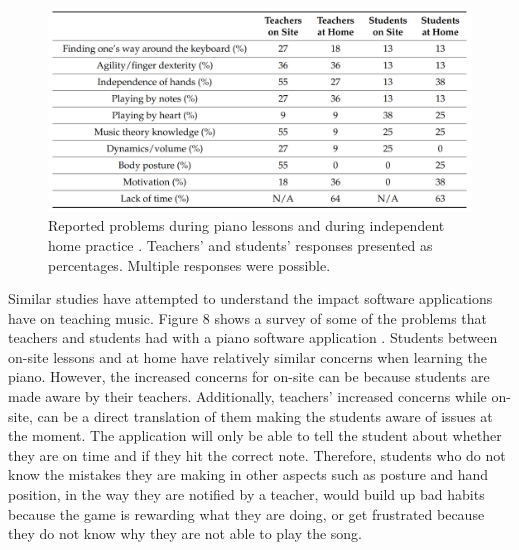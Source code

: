 \documentclass[10pt,twocolumn]{article}
\begin{document}
\begin{figure}
    \centering
    \includegraphics[width=.95\linewidth]{PianoLearningProblemsTable.png}
    \caption{
       Reported problems during piano lessons and during independent home practice \cite{PianoTeachingAndLearningConcerns}. Teachers’ and students’ responses presented as percentages. Multiple responses were possible.
    }
    \label{fig:first-page}
\end{figure}

Similar studies have attempted to understand the impact software applications have on teaching music. Figure 8 shows a survey of some of the problems that teachers and students had with a piano software application \cite{PianoTeachingAndLearningConcerns}. Students between on-site lessons and at home have relatively similar concerns when learning the piano. However, the increased concerns for on-site can be because students are made aware by their teachers. Additionally, teachers' increased concerns while on-site, can be a direct translation of them making the students aware of issues at the moment. The application will only be able to tell the student about whether they are on time and if they hit the correct note. Therefore, students who do not know the mistakes they are making in other aspects such as posture and hand position, in the way they are notified by a teacher, would build up bad habits because the game is rewarding what they are doing, or get frustrated because they do not know why they are not able to play the song. 
\end{document}
